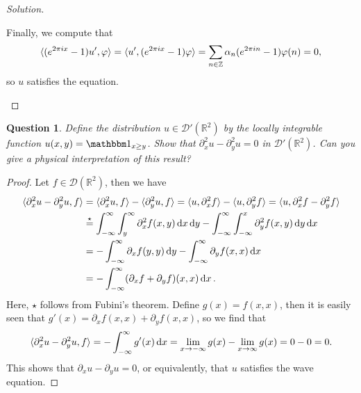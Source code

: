 \documentclass{article}
\theoremstyle{plain}
\newtheorem{question}{Question}
\theoremstyle{remark}
\newenvironment{solution}{\begin{proof}[Solution]\renewcommand\qedsymbol{}}{\end{proof}}
\renewcommand{\phi}{\varphi}
\newcommand{\Bb}{\mathbb}
\newcommand{\Cal}{\mathcal}
\newcommand{\CC}{\Bb C}
\newcommand{\RR}{\Bb R}
\newcommand{\DD}{\Cal D}
\newcommand\ZZ{\Bb Z}
\DeclarePairedDelimiter{\ang}{\langle}{\rangle}
\newcommand\ind{\mathbbm 1} %
\newcommand\pt\partial
\begin{document}
\begin{solution}
\begin{enumerate}[(a)]
Finally, we compute that 
	\[
	\ang{(e^{2\pi i x} - 1) u', \phi} = \ang{u', (e^{2\pi i x} -1 )\phi} = \sum_{n \in \ZZ} \alpha_n (e^{2\pi i n} - 1) \phi(n) = 0,
	\]
	so $u$ satisfies the equation. 
	\end{enumerate}
\end{solution}

\begin{question}
	Define the distribution $u \in \DD'(\RR^2)$ by the locally integrable function $u(x, y) = \ind_{x \geq y}$. Show that $\pt_x^2   u - \pt_y^2 u = 0$ in $\DD'(\RR^2)$. Can you give a physical interpretation of this result?
\end{question}

\begin{proof}
	Let $f \in \DD(\RR^2)$, then we have
	\begin{align*}
		\ang{\pt_x^2 u - \pt_y^2 u, f} &= \ang{\pt_x^2 u, f}- \ang{\pt_y^2 u, f} = \ang{u, \pt_x^2 f} - \ang{u, \pt_y^2 f} = \ang{u, \pt_x^2 f - \pt_y^2 f} \\
		&\overset\star= \int_{-\infty}^\infty \int_{y}^\infty \pt_x^2 f(x, y) \dd{x}\dd{y} - \int_{-\infty}^\infty \int_{-\infty}^x \pt_y^2 f(x, y) \dd{y} \dd{x} \\
		&= - \int_{-\infty}^\infty \pt_x f(y, y) \dd{y} - \int_{-\infty}^\infty \pt_y f(x, x) \dd{x}
		\\
		&= - \int_{-\infty}^\infty (\pt_xf + \pt_yf)(x, x) \dd{x}.
	\end{align*}
Here, $\star$ follows from Fubini's theorem. 
Define $g(x) = f(x, x)$, then it is easily seen that $g'(x) = \pt_x f(x, x) + \pt_y f(x, x)$, so we find that
\[
\ang{\pt_x^2 u - \pt_y^2 u, f} = 
- \int_{-\infty}^\infty g'(x) \dd{x} = \lim_{x\to -\infty} g(x) - \lim_{x\to\infty} g(x) = 0 - 0 = 0. 
\]
This shows that $\pt_x u - \pt_y u = 0$, or equivalently, that $u$ satisfies the wave equation. 
\end{proof}
\end{document}
